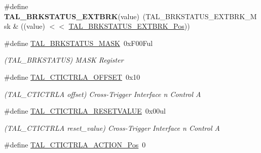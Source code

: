 \begin{DoxyCompactItemize}
\item 
\hypertarget{group___s_a_m_l21___t_a_l_ga9ddb7638e68bd6bed1d84d9c3e355e11}{}\#define {\bfseries T\+A\+L\+\_\+\+B\+R\+K\+S\+T\+A\+T\+U\+S\+\_\+\+E\+X\+T\+B\+R\+K}(value)~(T\+A\+L\+\_\+\+B\+R\+K\+S\+T\+A\+T\+U\+S\+\_\+\+E\+X\+T\+B\+R\+K\+\_\+\+Msk \& ((value) $<$$<$ \hyperlink{group___s_a_m_l21___t_a_l_ga9949164282f874454e8315d0c49bfcc0}{T\+A\+L\+\_\+\+B\+R\+K\+S\+T\+A\+T\+U\+S\+\_\+\+E\+X\+T\+B\+R\+K\+\_\+\+Pos}))\label{group___s_a_m_l21___t_a_l_ga9ddb7638e68bd6bed1d84d9c3e355e11}

\item 
\hypertarget{group___s_a_m_l21___t_a_l_gaf8c5a8733549824f71361f632cc7ac8b}{}\#define \hyperlink{group___s_a_m_l21___t_a_l_gaf8c5a8733549824f71361f632cc7ac8b}{T\+A\+L\+\_\+\+B\+R\+K\+S\+T\+A\+T\+U\+S\+\_\+\+M\+A\+S\+K}~0x\+F00\+Ful\label{group___s_a_m_l21___t_a_l_gaf8c5a8733549824f71361f632cc7ac8b}

\begin{DoxyCompactList}\small\item\em (T\+A\+L\+\_\+\+B\+R\+K\+S\+T\+A\+T\+U\+S) M\+A\+S\+K Register \end{DoxyCompactList}\item 
\hypertarget{group___s_a_m_l21___t_a_l_gab5bcc450bae74b1215552735f6a8349e}{}\#define \hyperlink{group___s_a_m_l21___t_a_l_gab5bcc450bae74b1215552735f6a8349e}{T\+A\+L\+\_\+\+C\+T\+I\+C\+T\+R\+L\+A\+\_\+\+O\+F\+F\+S\+E\+T}~0x10\label{group___s_a_m_l21___t_a_l_gab5bcc450bae74b1215552735f6a8349e}

\begin{DoxyCompactList}\small\item\em (T\+A\+L\+\_\+\+C\+T\+I\+C\+T\+R\+L\+A offset) Cross-\/\+Trigger Interface n Control A \end{DoxyCompactList}\item 
\hypertarget{group___s_a_m_l21___t_a_l_gace02306bb361d3db97e9efc5da4c706d}{}\#define \hyperlink{group___s_a_m_l21___t_a_l_gace02306bb361d3db97e9efc5da4c706d}{T\+A\+L\+\_\+\+C\+T\+I\+C\+T\+R\+L\+A\+\_\+\+R\+E\+S\+E\+T\+V\+A\+L\+U\+E}~0x00ul\label{group___s_a_m_l21___t_a_l_gace02306bb361d3db97e9efc5da4c706d}

\begin{DoxyCompactList}\small\item\em (T\+A\+L\+\_\+\+C\+T\+I\+C\+T\+R\+L\+A reset\+\_\+value) Cross-\/\+Trigger Interface n Control A \end{DoxyCompactList}\item 
\hypertarget{group___s_a_m_l21___t_a_l_ga8854a5053c397d6160d4dbb6219a8f59}{}\#define \hyperlink{group___s_a_m_l21___t_a_l_ga8854a5053c397d6160d4dbb6219a8f59}{T\+A\+L\+\_\+\+C\+T\+I\+C\+T\+R\+L\+A\+\_\+\+A\+C\+T\+I\+O\+N\+\_\+\+Pos}~0\label{group___s_a_m_l21___t_a_l_ga8854a5053c397d6160d4dbb6219a8f59}


\end{DoxyCompactItemize}
